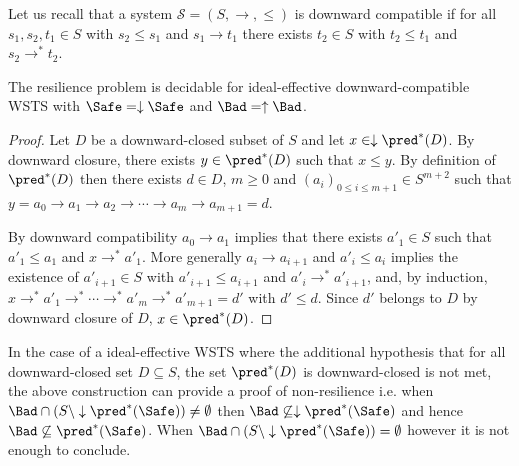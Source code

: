 Let us recall that a system $\mathscr{S}=(S,\rightarrow, \leq)$ is downward compatible if
for all $s_1, s_2, t_1 \in S$ with
$s_2 \leq s_1$ and $s_1 \to t_1$
there
exists $t_2 \in S$ with
$t_2 \leq t_1$ and $s_2 \to^* t_2$.

\begin{corollary}
The resilience problem is decidable for ideal-effective downward-compatible WSTS with 
$\Safe=\downarrow \Safe$
and $\Bad=\uparrow \Bad$.
\end{corollary}

\begin{proof}


Let $D$ be a downward-closed subset of $S$
and let $x \in \downarrow \pred^*(D)$.
By downward closure, there exists
$y \in \pred^*(D)$ 
such that $x \leq y$.
By definition of $\pred^*(D)$ then there exists 
$d \in D$, $m\geq 0$ and $(a_i)_{0 \leq i \leq m+1} \in S^{m+2}$ such that
$y = a_0 \to a_1 \to a_2 \to \cdots \to a_m \to a_{m+1} = d$.

By downward compatibility $a_0 \to a_1$
implies that there exists $a'_1 \in S$ such that $a'_1 \leq a_1$ and
$x \to^* a'_1$.
More generally $a_i \to a_{i+1}$ and
$a'_i\leq a_i$ implies the existence of $a'_{i+1} \in S$ with $a'_{i+1} \leq a_{i+1}$ and
$a'_i \to^* a'_{i+1}$,
and, by induction,
 $x \to^* a'_1 \to^* \cdots \to^* a'_{m} \to^* a'_{m+1} = d'$
with $d' \leq d$.
Since
$d'$ 
belongs to $D$ by downward closure of $D$, $x \in \pred^*(D)$.
\end{proof}

In the case
of a ideal-effective WSTS 
where
the additional hypothesis that
for all downward-closed set $D \subseteq S$, the set $\pred^*(D)$ is downward-closed
is not met,
the above construction
can provide a proof
of non-resilience
i.e. when
$\Bad \cap (S \setminus \downarrow\pred^*(\Safe)) \neq \emptyset$
then
$\Bad \not\subseteq \downarrow\pred^*(\Safe)$
and hence
$\Bad \not\subseteq \pred^*(\Safe)$.
When $\Bad \cap (S \setminus \downarrow\pred^*(\Safe)) = \emptyset$
however
it is not enough to conclude.




